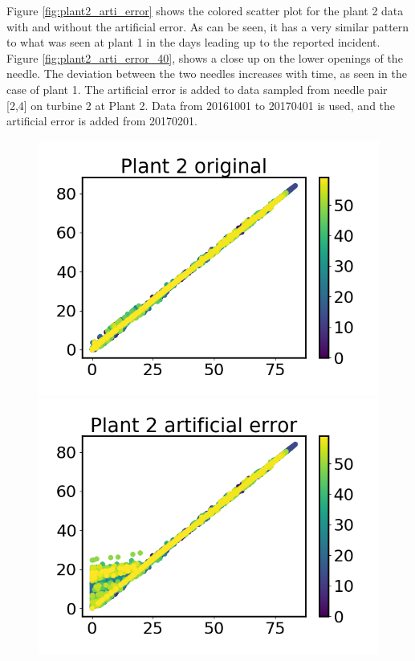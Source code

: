         Figure \ref{fig:plant2_arti_error} shows the colored scatter plot for the plant 2 data with and without the artificial error. As can be seen, it has a very similar pattern to what was seen at plant 1 in the days leading up to the reported incident. Figure \ref{fig:plant2_arti_error_40}, shows a close up on the lower openings of the needle. The deviation between the two needles increases with time, as seen in the case of plant 1. The artificial error is added to data sampled from needle pair [2,4] on turbine 2 at Plant 2. Data from 20161001 to 20170401 is used, and the artificial error is added from 20170201.     
        
        \begin{figure}
            \begin{minipage}[b]{0.5\linewidth}
                \centering
                \includegraphics[width = \textwidth]{report/figures/analysis/artificial error/original_data_small.png}
            \end{minipage}
            \begin{minipage}[b]{0.5\linewidth}
                \centering
                \includegraphics[width = \textwidth]{report/figures/analysis/artificial error/plant2_arti_error_small.png}

\end{minipage}
\end{figure}
